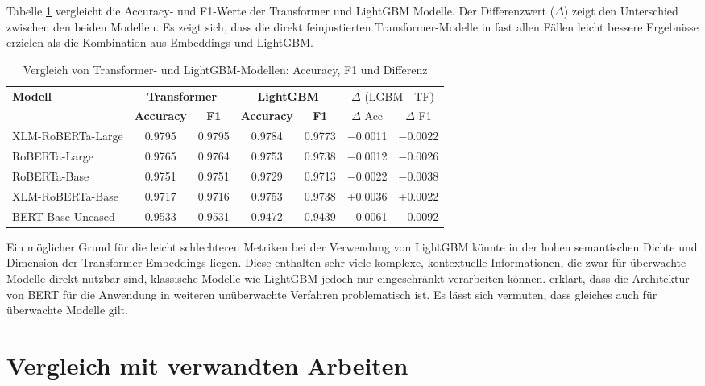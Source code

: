 Tabelle \ref{tab:transformer_vs_lightgbm} vergleicht die Accuracy- und F1-Werte der Transformer und LightGBM Modelle.
Der Differenzwert ($\Delta$) zeigt den Unterschied zwischen den beiden Modellen.
Es zeigt sich, dass die direkt feinjustierten Transformer-Modelle in fast allen Fällen leicht bessere Ergebnisse erzielen als die Kombination aus 
Embeddings und LightGBM.

\begin{table}[!ht]
\centering
\begin{tabular}{lcccccc}
    \toprule
    \multirow{2}{*}{\textbf{Modell}} &
    \multicolumn{2}{c}{\textbf{Transformer}} &
    \multicolumn{2}{c}{\textbf{LightGBM}} &
    \multicolumn{2}{c}{$\Delta$ (LGBM - TF)} \\
    \cmidrule(lr){2-3} \cmidrule(lr){4-5} \cmidrule(l){6-7}
    & \textbf{Accuracy} & \textbf{F1} & \textbf{Accuracy} & \textbf{F1} & $\Delta$ Acc & $\Delta$ F1 \\
    \midrule
    XLM-RoBERTa-Large & 0.9795 & 0.9795 & 0.9784 & 0.9773 & $-$0.0011 & $-$0.0022 \\
    RoBERTa-Large     & 0.9765 & 0.9764 & 0.9753 & 0.9738 & $-$0.0012 & $-$0.0026 \\
    RoBERTa-Base      & 0.9751 & 0.9751 & 0.9729 & 0.9713 & $-$0.0022 & $-$0.0038 \\
    XLM-RoBERTa-Base  & 0.9717 & 0.9716 & 0.9753 & 0.9738 & +0.0036 & +0.0022 \\
    BERT-Base-Uncased & 0.9533 & 0.9531 & 0.9472 & 0.9439 & $-$0.0061 & $-$0.0092 \\
    \bottomrule
\end{tabular}
\caption{Vergleich von Transformer- und LightGBM-Modellen: Accuracy, F1 und Differenz}
\label{tab:transformer_vs_lightgbm}
\end{table}

Ein möglicher Grund für die leicht schlechteren Metriken bei der Verwendung von LightGBM könnte in der hohen semantischen Dichte und Dimension der 
Transformer-Embeddings liegen. Diese enthalten sehr viele komplexe, kontextuelle Informationen, die zwar für überwachte Modelle direkt nutzbar sind, 
klassische Modelle wie LightGBM jedoch nur eingeschränkt verarbeiten können.
\cite{reimers-gurevych-2019-sentence} erklärt, dass die Architektur von BERT für die Anwendung in weiteren unüberwachte Verfahren problematisch ist.
Es lässt sich vermuten, dass gleiches auch für überwachte Modelle gilt.

\section{Vergleich mit verwandten Arbeiten}

